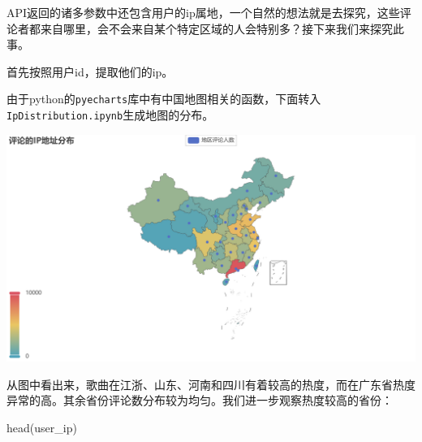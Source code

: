\documentclass[
]{article}
\newenvironment{Shaded}{\begin{snugshade}}{\end{snugshade}}
\newcommand{\AttributeTok}[1]{\textcolor[rgb]{0.77,0.63,0.00}{#1}}
\newcommand{\ConstantTok}[1]{\textcolor[rgb]{0.00,0.00,0.00}{#1}}
\newcommand{\ControlFlowTok}[1]{\textcolor[rgb]{0.13,0.29,0.53}{\textbf{#1}}}
\newcommand{\FunctionTok}[1]{\textcolor[rgb]{0.00,0.00,0.00}{#1}}
\newcommand{\NormalTok}[1]{#1}
\newcommand{\OtherTok}[1]{\textcolor[rgb]{0.56,0.35,0.01}{#1}}
\newcommand{\SpecialCharTok}[1]{\textcolor[rgb]{0.00,0.00,0.00}{#1}}
\newcommand{\StringTok}[1]{\textcolor[rgb]{0.31,0.60,0.02}{#1}}
\begin{document}
API返回的诸多参数中还包含用户的ip属地，一个自然的想法就是去探究，这些评论者都来自哪里，会不会来自某个特定区域的人会特别多？接下来我们来探究此事。

首先按照用户id，提取他们的ip。

\begin{Shaded}
\end{Shaded}

由于python的\texttt{pyecharts}库中有中国地图相关的函数，下面转入\texttt{IpDistribution.ipynb}生成地图的分布。

\begin{center}\includegraphics[width=1\linewidth,height=1\textheight]{img/all_ip} \end{center}

从图中看出来，歌曲在江浙、山东、河南和四川有着较高的热度，而在广东省热度异常的高。其余省份评论数分布较为均匀。我们进一步观察热度较高的省份：

\begin{Shaded}
\begin{Highlighting}[]
\FunctionTok{head}\NormalTok{(user\_ip)}
\end{Highlighting}
\end{Shaded}
\end{document}
